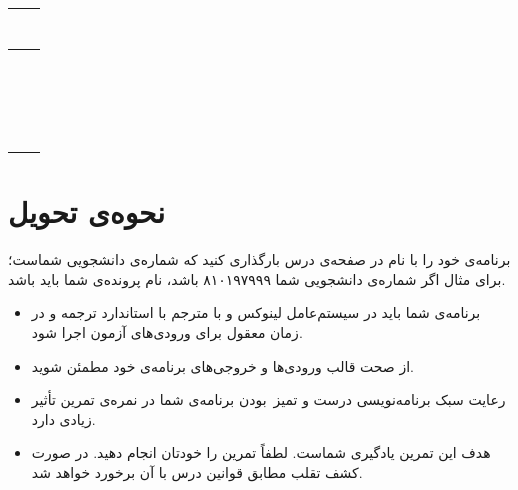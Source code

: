 \documentclass{utap}
\begin{document}
\begin{table}[H]
\begin{tabular}{|c|c|}
\begin{latin}
\begin{minipage}[]{0.3\textwidth}
\begin{verbatim}
            \end{verbatim}
            \end{minipage}\end{latin}
            \\
            \hline
            \begin{latin}\begin{minipage}[]{0.3\textwidth}\footnotesize
            
            \end{minipage}\end{latin}
            &
            \begin{latin}\begin{minipage}[]{0.3\textwidth}\footnotesize
            
            \begin{verbatim}





            \end{verbatim}
            \end{minipage}\end{latin}
            \\
            \hline
        \end{tabular}
    \end{table}
    
    \section{نحوه‌ی تحویل}

    برنامه‌ی خود را با نام  در صفحه‌ی  درس بارگذاری کنید که  شماره‌ی دانشجویی شماست؛ برای مثال اگر شماره‌ی دانشجویی شما ۸۱۰۱۹۷۹۹۹ باشد، نام پرونده‌ی شما باید  باشد.

    \begin{itemize}
        \item برنامه‌ی شما باید در سیستم‌عامل لینوکس و با مترجم  با استاندارد  ترجمه و در زمان معقول برای ورودی‌های آزمون اجرا شود.
        \item از صحت قالب ورودی‌ها و خروجی‌های برنامه‌ی خود مطمئن شوید.
        \item رعایت سبک برنامه‌نویسی درست و تمیز~بودن برنامه‌ی شما در نمره‌ی تمرین تأثیر زیادی دارد.
        \item هدف این تمرین یادگیری شماست. لطفاً تمرین را خودتان انجام دهید. در صورت کشف تقلب مطابق قوانین درس با آن برخورد خواهد شد.
    \end{itemize}
\end{document}
